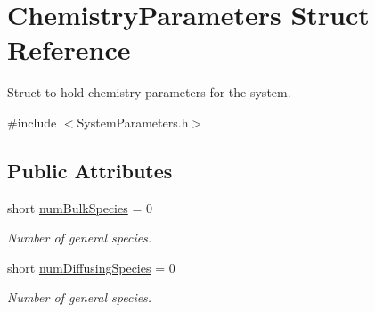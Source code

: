 \hypertarget{structChemistryParameters}{\section{Chemistry\+Parameters Struct Reference}
\label{structChemistryParameters}
}


Struct to hold chemistry parameters for the system.  




{\ttfamily \#include $<$System\+Parameters.\+h$>$}

\subsection*{Public Attributes}
{\bf }\par
\begin{DoxyCompactItemize}
\item 
short \hyperlink{structChemistryParameters_a33f49ae4bed264d303989b7372b1ba4b}{num\+Bulk\+Species} = 0
\begin{DoxyCompactList}\small\item\em Number of general species. \end{DoxyCompactList}\item 
short \hyperlink{structChemistryParameters_a78116d90c15faebd400cb5c75ce00e26}{num\+Diffusing\+Species} = 0
\begin{DoxyCompactList}\small\item\em Number of general species. \end{DoxyCompactList}\end{DoxyCompactItemize}


